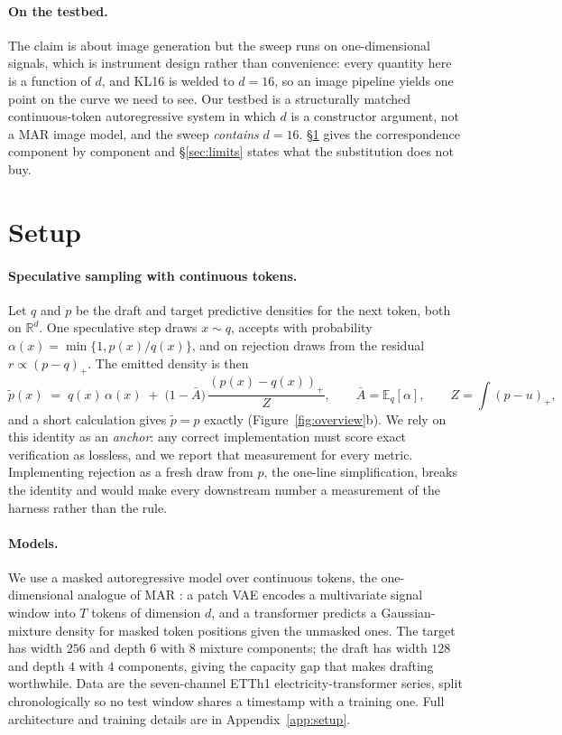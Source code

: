 \documentclass[10pt]{article}
\newcommand{\R}{\mathbb{R}}
\newcommand{\E}{\mathbb{E}}
\newcommand{\dd}{d}
\begin{document}
\paragraph{On the testbed.} The claim is about image generation but the sweep runs on
one-dimensional signals, which is instrument design rather than convenience: every quantity here is
a function of $\dd$, and KL16 is welded to $\dd = 16$, so an image pipeline yields one point on the
curve we need to see. Our testbed is a structurally matched continuous-token autoregressive system
in which $\dd$ is a constructor argument, not a MAR image model, and the sweep \emph{contains}
$\dd = 16$. \S\ref{sec:setup} gives the correspondence component by component and
\S\ref{sec:limits} states what the substitution does not buy.

\section{Setup}
\label{sec:setup}

\paragraph{Speculative sampling with continuous tokens.} Let $q$ and $p$ be the draft and target
predictive densities for the next token, both on $\R^\dd$. One speculative step draws $x \sim q$,
accepts with probability $\alpha(x) = \min\{1, p(x)/q(x)\}$, and on rejection draws from the residual
$r \propto (p - q)_+$. The emitted density is then
\begin{equation}
\tilde{p}(x) \;=\; q(x)\,\alpha(x) \;+\; \bigl(1 - \bar{A}\bigr)\,\frac{(p(x) - q(x))_+}{Z},
\qquad \bar{A} = \E_q[\alpha], \qquad Z = \textstyle\int (p-u)_+,
\label{eq:exact}
\end{equation}
and a short calculation gives $\tilde{p} = p$ exactly (Figure~\ref{fig:overview}b). We rely on this
identity as an \emph{anchor}: any correct implementation must score exact verification as lossless,
and we report that measurement for every metric. Implementing rejection as a fresh draw from $p$, the
one-line simplification, breaks the identity and would make every downstream number a measurement of
the harness rather than the rule.

\paragraph{Models.} We use a masked autoregressive model over continuous tokens, the one-dimensional
analogue of MAR \citep{li2024autoregressive}: a patch VAE encodes a multivariate signal window into
$T$ tokens of dimension $\dd$, and a transformer predicts a Gaussian-mixture density for masked token
positions given the unmasked ones. The target has width $256$ and depth $6$ with $8$ mixture
components; the draft has width $128$ and depth $4$ with $4$ components, giving the capacity gap that
makes drafting worthwhile. Data are the seven-channel ETTh1 electricity-transformer series, split
chronologically so no test window shares a timestamp with a training one. Full architecture and
training details are in Appendix~\ref{app:setup}.
\end{document}
